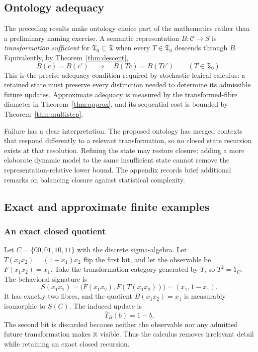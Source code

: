 \documentclass[11pt]{article}
\newcommand{\Ctxt}{\mathcal C}
\newcommand{\Trans}{\mathfrak T}
\begin{document}
\subsection{Ontology adequacy}

The preceding results make ontology choice part of the mathematics rather
than a preliminary naming exercise.  A semantic representation
$B:\Ctxt\to S$ is \emph{transformation sufficient} for
$\Trans_0\subseteq\Trans$ when every $T\in\Trans_0$ descends through $B$.
Equivalently, by Theorem~\ref{thm:descent},
\[
 B(c)=B(c')
 \quad\Longrightarrow\quad
 B(Tc)=B(Tc')
 \qquad(T\in\Trans_0).
\]
This is the precise adequacy condition required by stochastic lexical
calculus: a retained state must preserve every distinction needed to
determine its admissible future updates.  Approximate adequacy is measured by
the transformed-fibre diameter in Theorem~\ref{thm:approx}, and its sequential
cost is bounded by Theorem~\ref{thm:multistep}.

Failure has a clear interpretation.  The proposed ontology has merged
contexts that respond differently to a relevant transformation, so no closed
state recursion exists at that resolution.  Refining the state may restore
closure; adding a more elaborate dynamic model to the same insufficient state
cannot remove the representation-relative lower bound.  The appendix records
brief additional remarks on balancing closure against statistical complexity.

\subsection{Exact and approximate finite examples}

\subsubsection{An exact closed quotient}
Let $C=\{00,01,10,11\}$ with the discrete sigma-algebra. Let $T(x_1x_2)=(1-x_1)x_2$ flip the first bit, and let the observable be $F(x_1x_2)=x_1$. Take the transformation category generated by $T$, so $T^2=1_C$. The behavioral signature is
\[
S(x_1x_2)=\bigl(F(x_1x_2),F(T(x_1x_2))\bigr)=(x_1,1-x_1).
\]
It has exactly two fibres, and the quotient $B(x_1x_2)=x_1$ is measurably isomorphic to $S(C)$. The induced update is
\[
\overline T_B(b)=1-b.
\]
The second bit is discarded because neither the observable nor any admitted future transformation makes it visible. Thus the calculus removes irrelevant detail while retaining an exact closed recursion.
\end{document}
